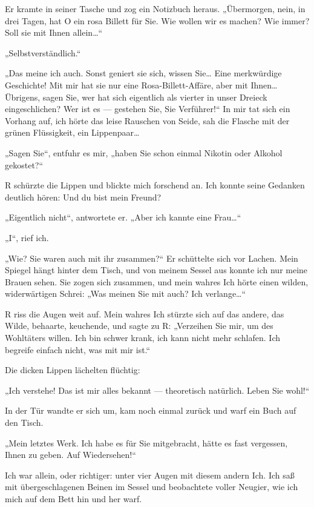 Er kramte in seiner
Tasche und zog ein Notizbuch heraus. „Übermorgen, nein, in drei
Tagen, hat O ein rosa Billett für Sie. Wie wollen wir es machen?
Wie immer? Soll sie mit Ihnen allein\ldots{}“

„Selbstverständlich.“

„Das meine ich auch. Sonst geniert sie sich, wissen Sie\ldots{} Eine
merkwürdige Geschichte! Mit mir hat sie nur eine
Rosa-Billett-Affäre, aber mit Ihnen\ldots{} Übrigens, sagen Sie, wer hat
sich eigentlich als vierter in unser Dreieck eingeschlichen? Wer
ist es — gestehen Sie, Sie Verführer!“ In mir tat sich ein Vorhang
auf, ich hörte das leise Rauschen von Seide, sah die Flasche mit
der grünen Flüssigkeit, ein Lippenpaar\ldots{}

„Sagen Sie“, entfuhr es mir, „haben Sie schon einmal Nikotin oder
Alkohol gekostet?“

R schürzte die Lippen und blickte mich forschend an. Ich konnte
seine Gedanken deutlich hören: Und du bist mein Freund?

„Eigentlich nicht“, antwortete er. „Aber ich kannte eine Frau\ldots{}“

„I“, rief ich.

„Wie? Sie waren auch mit ihr zusammen?“ Er schüttelte sich vor
Lachen. Mein Spiegel hängt hinter dem Tisch, und von meinem Sessel
aus konnte ich nur meine Brauen sehen. Sie zogen sich zusammen, und
mein wahres Ich hörte einen wilden, widerwärtigen Schrei: „Was
meinen Sie mit \glq{}auch\grq{}? Ich verlange\ldots{}“

R
riss die Augen weit auf. Mein wahres Ich stürzte sich auf das
andere, das Wilde, behaarte, keuchende, und sagte zu R: „Verzeihen
Sie mir, um des Wohltäters willen. Ich bin schwer krank, ich kann
nicht mehr schlafen. Ich begreife einfach nicht, was mit mir ist.“

Die dicken Lippen lächelten flüchtig:

„Ich verstehe! Das ist mir alles bekannt — theoretisch natürlich.
Leben Sie wohl!“

In der Tür wandte er sich um, kam noch einmal zurück und warf ein
Buch auf den Tisch.

„Mein letztes Werk. Ich habe es für Sie mitgebracht, hätte es fast
vergessen, Ihnen zu geben. Auf Wiedersehen!“

Ich war allein, oder richtiger: unter vier Augen mit diesem andern
Ich. Ich saß mit übergeschlagenen Beinen im Sessel und beobachtete
voller Neugier, wie ich mich auf dem Bett hin und her warf.

